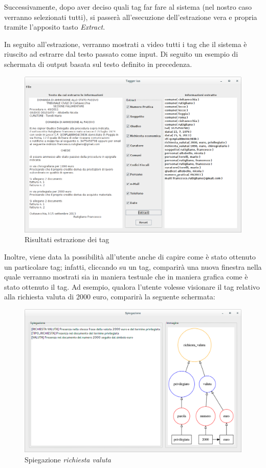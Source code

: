 Successivamente, dopo aver deciso quali tag far fare al sistema (nel nostro caso verranno selezionati tutti), si passerà all'esecuzione dell'estrazione vera e propria tramite l'apposito tasto \emph{Extract}.

In seguito all'estrazione, verranno mostrati a video tutti i tag che il sistema è riuscito ad estrarre dal testo passato come input. Di seguito un esempio di schermata di output basata sul testo definito in precedenza.

\begin{figure}[H]
	\includegraphics[width=1\textwidth]{img/interfaces/java-result.png}
	\caption[Schermata java result]{Risultati estrazione dei tag}
	\label{java-result}
\end{figure}

Inoltre, viene data la possibilità all'utente anche di capire come è stato ottenuto un particolare tag; infatti, cliccando su un tag, comparirà una nuova finestra nella quale verranno mostrati sia in maniera testuale che in maniera grafica come è stato ottenuto il tag.
Ad esempio, qualora l'utente volesse visionare il tag relativo alla richiesta valuta di 2000 euro, comparirà la seguente schermata:

\begin{figure}[H]
	\includegraphics[width=1\textwidth]{img/interfaces/java-richiestavaluta.png}
	\caption[Schermata java explain richiesta valuta]{Spiegazione \emph{richiesta valuta}}
	\label{java-richiestavaluta}
\end{figure}

